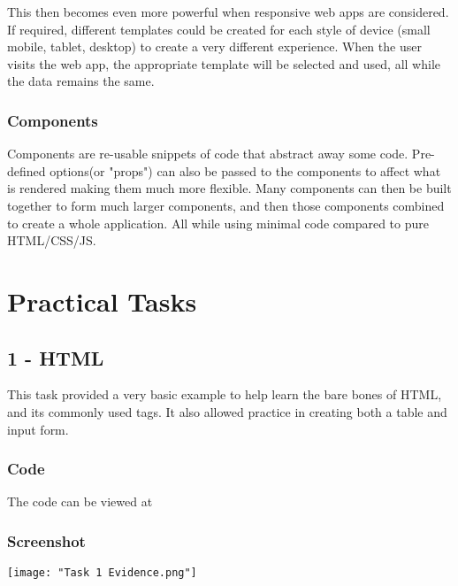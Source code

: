 \documentclass[portfolio.tex]{subfiles}
\begin{document}
					 This then becomes even more powerful when responsive web apps are considered. If required, different templates could be created for each style of device (small mobile, tablet, desktop) to create a very different experience. When the user visits the web app, the appropriate template will be selected and used, all while the data remains the same.\\


					\subsubsection{Components}
						Components are re-usable snippets of code that abstract away some code. Pre-defined options(or "props") can also be passed to the components to affect what is rendered making them much more flexible. Many components can then be built together to form much larger components, and then those components combined to create a whole application. All while using minimal code compared to pure HTML/CSS/JS. \\

				\hspace{-0.8cm}


		\section{Practical Tasks}
			\subsection{1 - HTML}
				 This task provided a very basic example to help learn the bare bones of HTML, and its commonly used tags. It also allowed practice in creating both a table and input form.
				\subsubsection{Code}
				The code can be viewed at 


				\subsubsection{Screenshot}
					\label{task-1.1}
					\texttt{[image: "Task 1 Evidence.png"]}
\end{document}
